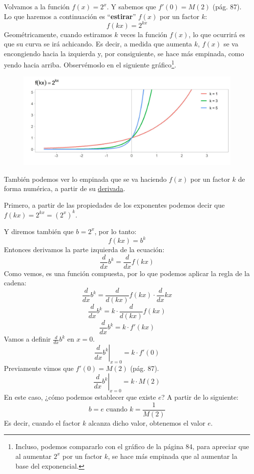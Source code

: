 \documentclass[12pt]{article}
\begin{document}
Volvamos a la función $f(x) = 2^{x}$. Y sabemos que $f'(0) = M(2)$ (pág. 87). Lo que haremos a continuación es ``\textbf{estirar}'' $f(x)$ por un factor $k$:
\[f(kx) = 2^{kx}\]
Geométricamente, cuando estiramos $k$ veces la función $f(x)$, lo que ocurrirá es que su curva se irá achicando. Es decir, a medida que aumenta $k$, $f(x)$ se va encongiendo hacia la izquierda y, por consiguiente, se hace más empinada, como yendo hacia arriba. Observémoslo en el siguiente gráfico\footnote{Incluso, podemos compararlo con el gráfico de la página 84, para apreciar que al aumentar $2^{x}$ por un factor $k$, se hace más empinada que al aumentar la base del exponencial.}.

\newpage

\begin{figure}[hbt!]
\centering
\includegraphics[scale=0.7]{img/exp_plot_5.jpg}
\end{figure}

También podemos ver lo empinada que se va haciendo $f(x)$ por un factor $k$ de forma numérica, a partir de su \underline{derivada}.

Primero, a partir de las propiedades de los exponentes podemos decir que $f(kx) = 2^{kx} = (2^{x})^{k}$.

Y diremos también que $b = 2^{x}$, por lo tanto:
\[f(kx) = b^{k}\]
Entonces derivamos la parte izquierda de la ecuación:
\[\frac{d}{dx} b^{k} = \frac{d}{dx} f(kx)\]
Como vemos, es una función compuesta, por lo que podemos aplicar la regla de la cadena:
\[\frac{d}{dx} b^{k} = \frac{d}{d(kx)} f(kx) \cdot \frac{d}{dx} kx\]
\[\frac{d}{dx} b^{k} = k \cdot \frac{d}{d(kx)} f(kx)\]
\[\frac{d}{dx} b^{k} = k \cdot f'(kx)\]
Vamos a definir $\frac{d}{dx} b^{k}$ en $x = 0$.
\[\left. \frac{d}{dx} b^{k} \right|_{x = 0} = k \cdot f'(0)\]
Previamente vimos que $f'(0) = M(2)$ (pág. 87).
\[\left. \frac{d}{dx} b^{k} \right|_{x = 0} = k \cdot M(2)\]
En este caso, ¿cómo podemos establecer que existe $e$? A partir de lo siguiente:
\[b = e \text{ cuando } k = \frac{1}{M(2)}\]
Es decir, cuando el factor $k$ alcanza dicho valor, obtenemos el valor $e$.
\end{document}
